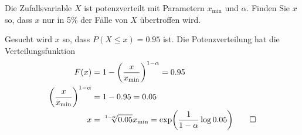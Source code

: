 Die Zufallsvariable $X$ ist potenzverteilt mit Parametern $x_{\text{min}}$
und $\alpha$.
Finden Sie $x$ so, dass $x$ nur in 5\% der Fälle von $X$ übertroffen wird.


\begin{loesung}
Gesucht wird $x$ so, dass $P(X\le x)=0.95$ ist.
Die Potenzverteilung hat die Verteilungsfunktion
\begin{align*}
F(x)
&=1-\biggl(\frac{x}{x_{\text{min}}}\biggr)^{1-\alpha}=0.95
\\
\biggl(\frac{x}{x_{\text{min}}}\biggr)^{1-\alpha}
&=1-0.95=0.05
\\
x&=\root{1-\alpha}\of{0.05} x_{\text{min}}
=
\exp\biggl(
\frac1{1-\alpha}\log 0.05
\biggr)
\qedhere
\end{align*}
\end{loesung}

